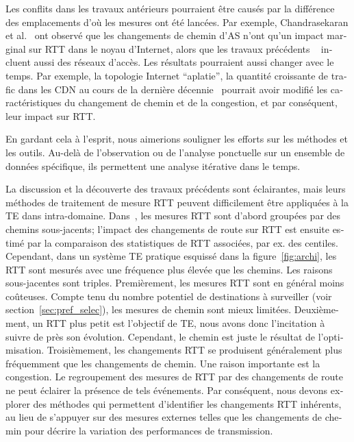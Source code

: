\begin{otherlanguage}{french}
Les conflits dans les travaux antérieurs pourraient être causés par la différence des emplacements d'où les mesures ont été lancées.
Par exemple, Chandrasekaran et al.~\cite{Chandrasekaran} ont observé que les changements de chemin d'AS n'ont qu'un impact marginal sur RTT dans le noyau d'Internet, 
alors que les travaux précédents ~\cite {Pucha2007, Schwartz2010} incluent aussi des réseaux d'accès.
Les résultats pourraient aussi changer avec le temps. 
Par exemple, la topologie Internet ``aplatie'', la quantité croissante de trafic dans les CDN au cours de la dernière décennie~\cite{Labovitz2011, Roughan2011}
pourrait avoir modifié les caractéristiques du changement de chemin et de la congestion, et par conséquent, leur impact sur RTT.

En gardant cela à l'esprit, nous aimerions souligner les efforts sur les méthodes et les outils.
Au-delà de l'observation ou de l'analyse ponctuelle sur un ensemble de données spécifique, 
ils permettent une analyse itérative dans le temps.

La discussion et la découverte des travaux précédents sont éclairantes, 
mais leurs méthodes de traitement de mesure RTT peuvent difficilement être appliquées à la TE dans intra-domaine.
Dans~\cite{Pucha2007, Schwartz2010, Chandrasekaran},
les mesures RTT sont d'abord groupées par des chemins sous-jacents;
l'impact des changements de route sur RTT est ensuite estimé par la comparaison des statistiques de RTT associées, par ex. des centiles.
Cependant, dans un système TE pratique esquissé dans la figure~\ref{fig:archi}, les RTT sont mesurés avec une fréquence plus élevée que les chemins.
Les raisons sous-jacentes sont triples.
Premièrement, les mesures RTT sont en général moins coûteuses.
Compte tenu du nombre potentiel de destinations à surveiller (voir section~\ref {sec:pref_selec}), les mesures de chemin sont mieux limitées.
Deuxièmement, un RTT plus petit est l'objectif de TE, nous avons donc l'incitation à suivre de près son évolution. 
Cependant, le chemin est juste le résultat de l'optimisation.
Troisièmement, les changements RTT se produisent généralement plus fréquemment que les changements de chemin.
Une raison importante est la congestion.
Le regroupement des mesures de RTT par des changements de route ne peut éclairer la présence de tels événements.
Par conséquent, nous devons explorer des méthodes qui permettent d'identifier les changements RTT inhérents, 
au lieu de s'appuyer sur des mesures externes telles que les changements de chemin pour décrire la variation des performances de transmission.


\end{otherlanguage}
